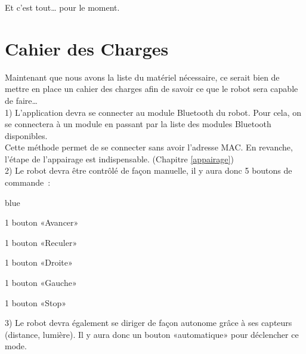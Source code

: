 Et c'est tout… pour le moment.


\section{Cahier des Charges}

Maintenant que nous avons la liste du matériel nécessaire, ce serait bien de mettre en place un cahier des charges afin de savoir ce que le robot sera capable de faire… \\

1) L'application devra se connecter au module Bluetooth du robot.
Pour cela, on se connectera  à un module en passant par la liste des modules Bluetooth disponibles.\\
Cette méthode permet de se connecter sans avoir l'adresse MAC. En revanche, l'étape de l'appairage est indispensable. (Chapitre \ref{appairage}) \\

2) Le robot devra être contrôlé de façon manuelle,  il y aura donc 5 boutons de commande :

\begin{items}{blue}{\Triangle}
    \item 1 bouton «Avancer»
    \item 1 bouton «Reculer»
    \item 1 bouton «Droite»
    \item 1 bouton «Gauche»
    \item 1 bouton «Stop»
\end{items}


3) Le robot devra également se diriger de façon autonome grâce à ses capteurs (distance, lumière). Il y aura donc un bouton «automatique» pour déclencher ce mode. \\



